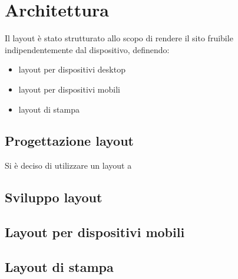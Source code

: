 \section{Architettura}{
	Il layout è stato strutturato allo scopo di rendere il sito fruibile indipendentemente dal dispositivo, definendo:
	\begin{itemize}\itemsep1pt
		\item layout per dispositivi desktop
		\item layout per dispositivi mobili
		\item layout di stampa
	\end{itemize} 
	
	\subsection{Progettazione layout}{
		Si è deciso di utilizzare un layout a 
	}
	\subsection{Sviluppo layout}{
		}
	\subsection{Layout per dispositivi mobili}{
		
	}
	\subsection{Layout di stampa}{
		
	}
}